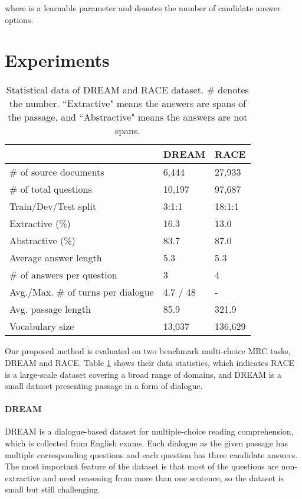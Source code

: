 \documentclass[letterpaper]{article} \usepackage{aaai21}  \usepackage{times}  \usepackage{helvet} \usepackage{courier}  \usepackage[hyphens]{url}  \usepackage{graphicx} \urlstyle{rm} \def\UrlFont{\rm}  \usepackage{natbib}  \usepackage{caption} \frenchspacing  \setlength{\pdfpagewidth}{8.5in}  \setlength{\pdfpageheight}{11in}
\begin{document}
where  is a learnable parameter and  denotes the number of candidate answer options.

\section{Experiments}
\begin{table}[t]\small
\renewcommand\arraystretch{1.1}
	\centering
	{
		\begin{tabular}{l|l|l}
			\hline		
			  & DREAM & RACE  \\
			\hline
			\hline
			\# of source documents & 6,444 & 27,933    \\
			\# of total questions & 10,197 & 97,687 \\
			Train/Dev/Test split & 3:1:1 &18:1:1 \\
			Extractive (\%)   & 16.3 & 13.0   \\
			Abstractive (\%)  & 83.7  & 87.0 \\
			Average answer length  & 5.3 & 5.3  \\
			\# of answers per question & 3 & 4 \\
			Avg./Max. \# of turns per dialogue & 4.7 / 48 & -  \\
			Avg. passage length & 85.9 & 321.9  \\
			Vocabulary size  & 13,037 & 136,629 \\
			\hline
		\end{tabular}
		
	}
	\caption{\label{statistics} Statistical data of DREAM and RACE dataset. \# denotes the number. ``Extractive" means the answers are spans of the passage, and ``Abstractive" means the answers are not spans.}
\end{table}

Our proposed method is evaluated on two benchmark multi-choice MRC tasks, DREAM and RACE. Table \ref{statistics} shows their data statistics, which indicates RACE is a large-scale dataset covering a broad range of domains, and DREAM is a small dataset presenting passage in a form of dialogue.

\paragraph{DREAM} DREAM \cite{dream} is a dialogue-based dataset for multiple-choice reading comprehension, which is collected from English exams. Each dialogue as the given passage has multiple corresponding questions and each question has three candidate answers. The most important feature of the dataset is that most of the questions are non-extractive and need reasoning from more than one sentence, so the dataset is small but still challenging. 
\end{document}
